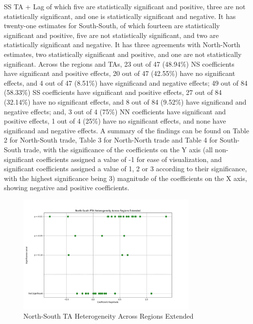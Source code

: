 \documentclass[12pt]{article}%
\begin{document}
SS TA + Lag of which five are statistically significant and positive,
three are not statistically significant, and one is statistically
significant and negative. It has twenty-one estimates for South-South,
of which fourteen are statistically significant and positive, five are
not statistically significant, and two are statistically significant and
negative. It has three agreements with North-North estimates, two
statistically significant and positive, and one are not statistically
significant. Across the regions and TAs, 23 out of 47 (48.94\%) NS
coefficients have significant and positive effects, 20 out of 47
(42.55\%) have no significant effects, and 4 out of 47 (8.51\%) have
significand and negative effects; 49 out of 84 (58.33\%) SS coefficients
have significant and positive effects, 27 out of 84 (32.14\%) have no
significant effects, and 8 out of 84 (9.52\%) have significand and
negative effects; and, 3 out of 4 (75\%) NN coefficients have
significant and positive effects, 1 out of 4 (25\%) have no significant
effects, and none have significand and negative effects. A summary of
the findings can be found on Table 2 for North-South trade, Table 3 for
North-North trade and Table 4 for South-South trade, with the
significance of the coefficients on the Y axis (all non-significant
coefficients assigned a value of -1 for ease of visualization, and
significant coefficients assigned a value of 1, 2 or 3 according to
their significance, with the highest significance being 3) magnitude of
the coefficients on the X axis, showing negative and positive
coefficients.
%


\begin{figure}[h!]%
\centering%
\includegraphics[width=0.8\textwidth]{figures/North-South_trade_relationships_visualization.jpeg}%
\caption{North{-}South TA Heterogeneity Across Regions Extended}%
\end{figure}
\end{document}
